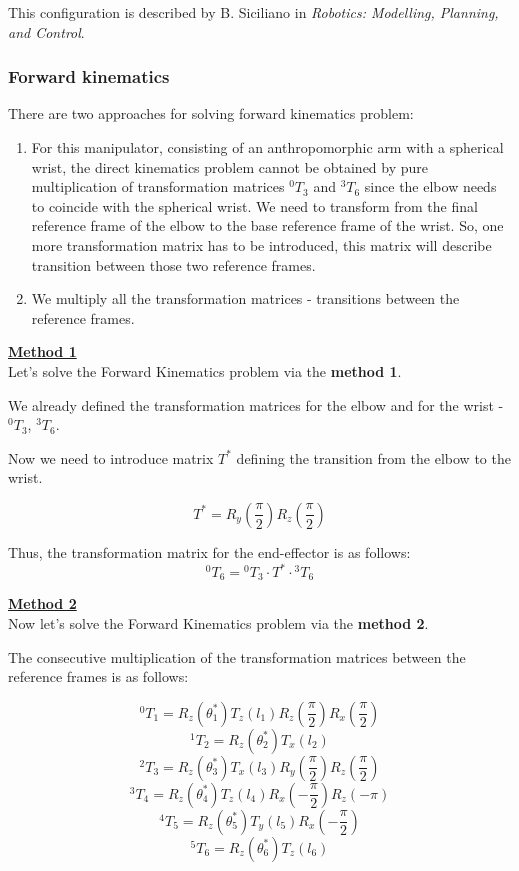 \documentclass{article}
\begin{document}
This configuration is described by B. Siciliano in \emph{Robotics: Modelling, Planning, and Control}.

\subsubsection{Forward kinematics}


There are two approaches for solving forward kinematics problem: 

\begin{enumerate}
    \item 
    For this manipulator, consisting of an anthropomorphic arm with a spherical wrist,
    the direct kinematics problem cannot be obtained by pure multiplication of transformation matrices ${}^0T_3$ and ${}^3T_6$ since 
    the elbow needs to coincide with the spherical wrist. 
    We need to transform from the final reference frame of the elbow to the base reference frame of the wrist.
    So, one more transformation matrix has to be introduced, this matrix will describe transition between those two reference frames.
    \item We multiply all the transformation matrices - transitions between the reference frames.
\end{enumerate}


\underline{\textbf{Method 1}}\\

Let's solve the Forward Kinematics problem via the \textbf{method 1}.

We already defined the transformation matrices for the elbow and for the wrist - ${}^0T_3$, ${}^3T_6$. 

Now we need to introduce matrix $T^*$ defining the transition from the elbow to the wrist.

\[T^* = R_y(\dfrac{\pi}{2}) R_z(\dfrac{\pi}{2})\]


Thus, the transformation matrix for the end-effector is as follows:
\[{}^0T_6 = {}^0T_3 \cdot T^* \cdot {}^3T_6\]




\underline{\textbf{Method 2}}\\

Now let's solve the Forward Kinematics problem via the \textbf{method 2}.

The consecutive multiplication of the transformation matrices between the reference frames is as follows:

\[{}^0T_1 = R_z(\theta_1^*) T_z(l_1) R_z(\frac{\pi}{2}) R_x(\frac{\pi}{2})\]
\[{}^1T_2 = R_z(\theta_2^*) T_x(l_2) \]
\[{}^2T_3 = R_z(\theta_3^*) T_x(l_3) R_y(\dfrac{\pi}{2}) R_z(\dfrac{\pi}{2})\]
\[{}^3T_4 = R_z(\theta_4^*) T_z(l_4) R_x(-\dfrac{\pi}{2}) R_z(-\pi)\]
\[{}^4T_5 = R_z(\theta_5^*) T_y(l_5) R_x(-\dfrac{\pi}{2})\]
\[{}^5T_6 = R_z(\theta_6^*) T_z(l_6)\]
\end{document}
